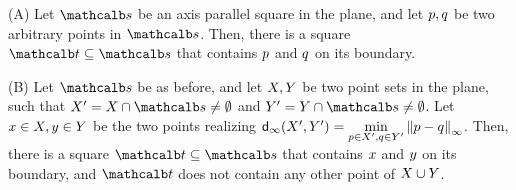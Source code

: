 \documentclass[12pt]{article}%
\begin{document}
\begin{lemma}
    (A) Let $\sqr$ be an axis parallel square in the plane, and let
    $p, q$ be two arbitrary points in $\sqr$. Then, there is a
    square $\sqrA \subseteq \sqr$ that contains $p$ and $q$ on its
    boundary.

    (B) Let $\sqr$ be as before, and let $X, Y$ be two point
    sets in the plane, such that
    $\PSX' = \PSX \cap \sqr \neq \emptyset$ and
    $\PSY' = \PSY \cap \sqr \neq \emptyset$. Let
    $x \in X, y \in Y$ be the two points realizing
    $\dsZ{\infty}{\PSX'}{\PSY'} = \underset{\pa \in \PSX', \pb \in
       \PSY'}{\min} \dZ{\infty}{\pa}{\pb}$. Then, there is a square
    $\sqrA \subseteq \sqr$ that contains $x$ and $y$ on its
    boundary, and $\sqrA$ does not contain any other point of
    $X \cup Y$.
\end{lemma}
\end{document}
